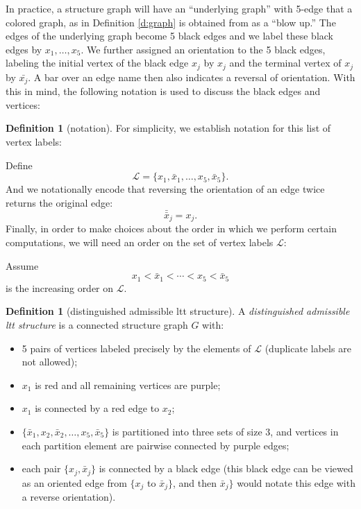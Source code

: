 \documentclass[11pt]{article}
\theoremstyle{definition}
\newtheorem{dfn}[thm]{Definition}
\begin{document}
In practice, a structure graph will have an ``underlying graph'' with 5-edge that a colored graph, as in Definition \ref{d:graph} is obtained from as a ``blow up.'' The edges of the underlying graph become 5 black edges and we label these black edges by $x_1, \dots, x_5$. We further assigned an orientation to the 5 black edges, labeling the initial vertex of the black edge $x_j$ by $x_j$ and the terminal vertex of $x_j$ by $\bar{x_j}$. A bar over an edge name then also indicates a reversal of orientation. With this in mind, the following notation is used to discuss the black edges and vertices:

\begin{dfn}[notation]
For simplicity, we establish notation for this list of vertex labels: 

Define
\[
\mathcal{L}=\{x_1,\bar{x}_1,\ldots,x_5,\bar{x}_5\}.
\]
And we notationally encode that reversing the orientation of an edge twice returns the original edge:
\[
\bar{\bar{x}}_j=x_j.
\]
Finally, in order to make choices about the order in which we perform certain computations, we will need an order on the set of vertex labels $\mathcal{L}$:

Assume
\[
x_1<\bar{x}_1<\cdots<x_5<\bar{x}_5
\]
is the increasing order on $\mathcal{L}$.
\end{dfn}

\begin{dfn}[distinguished admissible ltt structure]
A \emph{distinguished admissible ltt structure} is a connected structure graph $G$ with:
\begin{itemize}
  \item 5 pairs of vertices labeled precisely by the elements of $\mathcal{L}$ (duplicate labels are not allowed);
  \item $x_1$ is red and all remaining vertices are purple;
  \item $x_1$ is connected by a red edge to $x_2$;
  \item $\{\bar{x}_1,x_2,\bar{x}_2,\ldots,x_5,\bar{x}_5\}$ is partitioned into
        three sets of size $3$, and vertices in each partition element are pairwise connected by purple edges;
  \item each pair $\{x_j,\bar{x}_j\}$ is connected by a black edge (this black edge can be viewed as an oriented edge from $\{x_j$ to $\bar{x}_j\}$, and then $\bar{x}_j\}$ would notate this edge with a reverse orientation).
\end{itemize}
\end{dfn}
\end{document}
